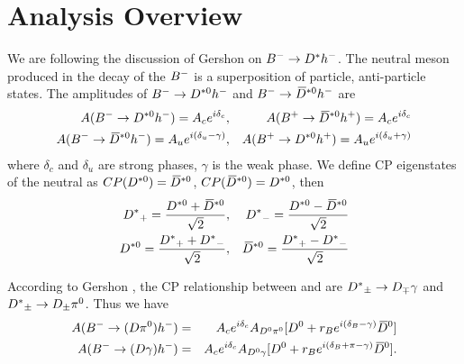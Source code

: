 \section{Analysis Overview}
We are following the discussion of Gershon \etal on $\Bm \to \Dstar h^-$.
The neutral \Dstar meson produced in the decay of the $\Bm$ is a superposition of particle, anti-particle states.
  The amplitudes of $\Bm \to \Dstarz h^-$ and $\Bm \to \Dstarzb h^-$ are
  \begin{eqnarray}
  A(\Bm \to \Dstarz h^-) = A_c e^{i\delta_c}&,&  A(\Bp \to \Dstarzb h^+) = A_c e^{i\delta_c} \\
A(\Bm \to \Dstarzb h^-) = A_u e^{i (\delta_u -\gamma)}&,&  A(\Bp \to \Dstarz h^+) = A_u e^{i(\delta_u + \gamma)} 
  \end{eqnarray}
 where $\delta_c$ and $\delta_u$ are strong phases, $\gamma$ is the weak phase.  
   We define CP eigenstates of the neutral \Dstar as $CP(\Dstarz) = \Dstarzb$, $CP(\Dstarzb) = \Dstarz$, then
\begin{eqnarray}
\Dstar_+ = \frac{\Dstarz + \Dstarzb}{\sqrt{2}}&,& \Dstar_- = \frac{\Dstarz - \Dstarzb}{\sqrt{2}} \\
\Dstarz = \frac{\Dstar_+ + \Dstar_-}{\sqrt{2}}&,& \Dstarzb = \frac{\Dstar_+ - \Dstar_-}{\sqrt{2}} 
\end{eqnarray}
  
  According to Gershon \etal, the CP relationship between \Dstar and \D are $\Dstar_{\pm} \to D_{\mp} \gamma$ and $\Dstar_{\pm} \to D_{\pm} \pi^0$.
  Thus we have 
   \begin{eqnarray}
 A(\Bm \to (D\pi^0) h^-) &=& A_c e^{i\delta_c } A_{D^0 \pi^0} [ \Dz + r_B e^{i (\delta_B -\gamma)} \Dzb ]  \\
 A(\Bm \to  (D\gamma) h^-) &=& A_c e^{i\delta_c } A_{D^0 \gamma}[\Dz + r_B e^{i (\delta_B +\pi -\gamma)} \Dzb].
 \end{eqnarray} 

